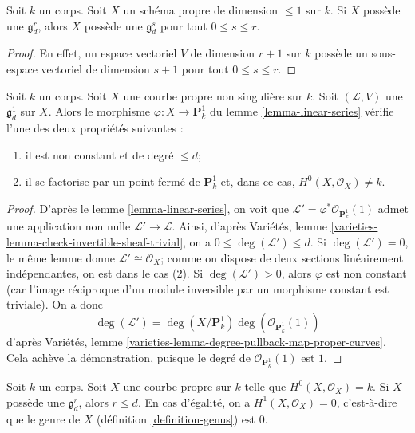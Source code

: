 \begin{lemma}
\label{lemma-linear-series-trivial-existence}
Soit $k$ un corps. Soit $X$ un schéma propre de dimension $\leq 1$ sur $k$. Si $X$ possède une $\mathfrak g^r_d$, alors $X$ possède une $\mathfrak g^s_d$ pour tout $0 \leq s \leq r$.
\end{lemma}

\begin{proof}
En effet, un espace vectoriel $V$ de dimension $r + 1$ sur $k$ possède un sous-espace vectoriel de dimension $s + 1$ pour tout $0 \leq s \leq r$.
\end{proof}

\begin{lemma}
\label{lemma-g1d}
Soit $k$ un corps. Soit $X$ une courbe propre non singulière sur $k$. Soit $(\mathcal{L}, V)$ une $\mathfrak g^1_d$ sur $X$. Alors le morphisme $\varphi : X \to \mathbf{P}^1_k$ du lemme \ref{lemma-linear-series} vérifie l'une des deux propriétés suivantes : \begin{enumerate} \item il est non constant et de degré $\leq d$; \item il se factorise par un point fermé de $\mathbf{P}^1_k$ et, dans ce cas, $H^0(X, \mathcal{O}_X) \not = k$.
\end{enumerate}
\end{lemma}

\begin{proof}
D'après le lemme \ref{lemma-linear-series}, on voit que $\mathcal{L}' = \varphi^*\mathcal{O}_{\mathbf{P}^1_k}(1)$ admet une application non nulle $\mathcal{L}' \to \mathcal{L}$. Ainsi, d'après Variétés, lemme \ref{varieties-lemma-check-invertible-sheaf-trivial}, on a $0 \leq \deg(\mathcal{L}') \leq d$. Si $\deg(\mathcal{L}') = 0$, le même lemme donne $\mathcal{L}' \cong \mathcal{O}_X$; comme on dispose de deux sections linéairement indépendantes, on est dans le cas (2). Si $\deg(\mathcal{L}') > 0$, alors $\varphi$ est non constant (car l'image réciproque d'un module inversible par un morphisme constant est triviale). On a donc $$
\deg(\mathcal{L}') =
\deg(X/\mathbf{P}^1_k) \deg(\mathcal{O}_{\mathbf{P}^1_k}(1))
$$ d'après Variétés, lemme \ref{varieties-lemma-degree-pullback-map-proper-curves}. Cela achève la démonstration, puisque le degré de $\mathcal{O}_{\mathbf{P}^1_k}(1)$ est $1$.
\end{proof}

\begin{lemma}
\label{lemma-grd-inequalities}
Soit $k$ un corps. Soit $X$ une courbe propre sur $k$ telle que $H^0(X, \mathcal{O}_X) = k$. Si $X$ possède une $\mathfrak g^r_d$, alors $r \leq d$. En cas d'égalité, on a $H^1(X, \mathcal{O}_X) = 0$, c'est-à-dire que le genre de $X$ (définition \ref{definition-genus}) est $0$.
\end{lemma}

